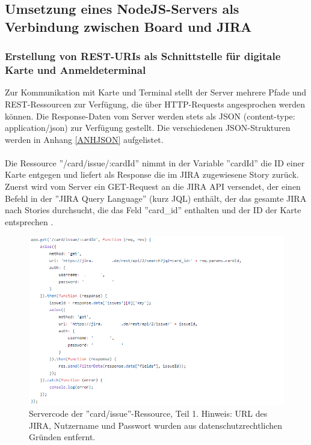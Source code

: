 \documentclass[12pt,titlepage]{scrartcl}
\begin{document}
		\subsection{Umsetzung eines NodeJS-Servers als Verbindung zwischen Board und JIRA} \label{implServer}
			\subsubsection{Erstellung von REST-URIs als Schnittstelle für digitale Karte und Anmeldeterminal} \label{ressourcenServer}
			Zur Kommunikation mit Karte und Terminal stellt der Server mehrere Pfade und REST-Ressourcen zur Verfügung, die über HTTP-Requests angesprochen werden können. Die Response-Daten vom Server werden stets als JSON (content-type: application/json) zur Verfügung gestellt. Die verschiedenen JSON-Strukturen werden in Anhang \ref{ANHJSON} aufgelistet. \\ \\
			Die Ressource ''/card/issue/:cardId'' nimmt in der Variable ''cardId'' die ID einer Karte entgegen und liefert als Response die im JIRA zugewiesene Story zurück. Zuerst wird vom Server ein GET-Request an die JIRA API versendet, der einen Befehl in der ''JIRA Query Language'' (kurz JQL) enthält, der das gesamte JIRA nach Stories durchsucht, die das Feld ''card\_id'' enthalten und der ID der Karte entsprechen \cite{jql}.
			\begin{figure}[H] 
  				\centering
    			\includegraphics[height=0.5\textheight]{serverCardIssue}
  				\caption{Servercode der ''card/issue''-Ressource, Teil 1. Hinweis: URL des JIRA, Nutzername und Passwort wurden aus datenschutzrechtlichen Gründen entfernt.}
  				\label{fig:serverCardIssue}
			\end{figure}
\end{document}
